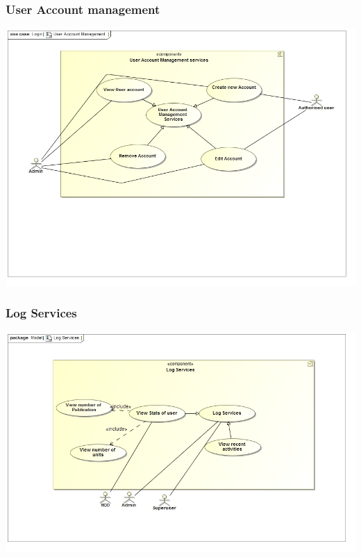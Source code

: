 \documentclass[11pt]{article}
\begin{document}
	\subsubsection{User Account management}
	\begin{center}
		\includegraphics[width=\textwidth]{../Images/UserAccountManagementUC.jpg}\\[0.5cm]
	\end{center}
	\subsubsection{Log Services}
	\begin{center}
		\includegraphics[width=\textwidth]{../Images/LogServicesUC.jpg}\\[0.5cm]
	\end{center}
\end{document}
